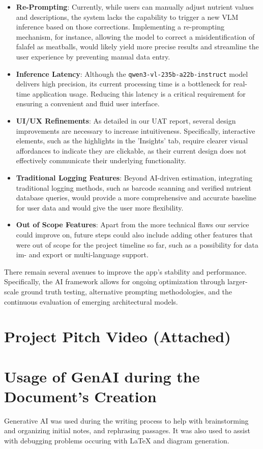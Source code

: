 \documentclass[11pt,a4paper]{article}
\begin{document}
\begin{itemize}
    \item \textbf{Re-Prompting}: Currently, while users can manually adjust nutrient values and descriptions, the system lacks the capability to trigger a new VLM inference based on those corrections. Implementing a re-prompting mechanism, for instance, allowing the model to correct a misidentification of falafel as meatballs, would likely yield more precise results and streamline the user experience by preventing manual data entry.
    \item \textbf{Inference Latency}: Although the  \texttt{qwen3-vl-235b-a22b-instruct} model delivers high precision, its current processing time is a bottleneck for real-time application usage. Reducing this latency is a critical requirement for ensuring a convenient and fluid user interface.
    \item \textbf{UI/UX Refinements}: As detailed in our UAT report, several design improvements are necessary to increase intuitiveness. Specifically, interactive elements, such as the highlights in the 'Insights' tab, require clearer visual affordances to indicate they are clickable, as their current design does not effectively communicate their underlying functionality.
    \item \textbf{Traditional Logging Features}: Beyond AI-driven estimation, integrating traditional logging methods, such as barcode scanning and verified nutrient database queries, would provide a more comprehensive and accurate baseline for user data and would give the user more flexibility.
    \item \textbf{Out of Scope Features}: Apart from the more technical flaws our service could improve on, future steps could also include adding other features that were out of scope for the project timeline so far, such as a possibility for data im- and export or multi-language support.
\end{itemize}
\noindent
There remain several avenues to improve the app’s stability and performance. Specifically, the AI framework allows for ongoing optimization through larger-scale ground truth testing, alternative prompting methodologies, and the continuous evaluation of emerging architectural models.

\section{Project Pitch Video (Attached)}

\section{Usage of GenAI during the Document's Creation}
\noindent
Generative AI was used during the writing process to help with brainstorming and organizing initial notes, and rephrasing passages.
It was also used to assist with debugging problems occuring with LaTeX and diagram generation.


\printbibliography
\end{document}
